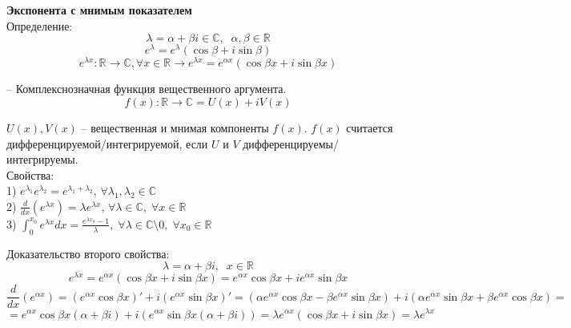 \documentclass{article}
\begin{document}
	
	\textbf{Экспонента с мнимым показателем}\\

	Определение:
	\begin{equation}
		\lambda = \alpha + \beta i \in \mathbb{C},\;\;\alpha,\beta\in\mathbb{R}
	\end{equation}
	\begin{equation}
		e^\lambda = e^\lambda(\cos\beta + i\sin\beta)
	\end{equation}
	\begin{equation}
		e^{\lambda x}: \mathbb{R}\rightarrow\mathbb{C},\forall x\in\mathbb{R}\rightarrow e^{\lambda x} = e^{\alpha x}(\cos\beta x + i\sin\beta x)
	\end{equation}

	-- Комплекснозначная функция вещественного аргумента.
	\begin{equation}
		f(x): \mathbb{R}\rightarrow\mathbb{C} = U(x)+iV(x)
	\end{equation}

	$U(x), V(x)$ -- вещественная и мнимая компоненты $f(x)$. $f(x)$ считается дифференцируемой/интегрируемой, если $U$ и $V$ дифференцируемы/интегрируемы.\\

	Свойства:\\

	1) $e^{\lambda_1}e^{\lambda_2}=e^{\lambda_1+\lambda_2}$, $\forall\lambda_1,\lambda_2\in\mathbb{C}$\\

	2) $\frac{d}{dx}(e^{\lambda x}) = \lambda e^{\lambda x}$, $\forall \lambda\in\mathbb{C},\;\forall x\in\mathbb{R}$\\

	3) $\int_0^{x_0}e^{\lambda x}dx = \frac{e^{\lambda x_0}-1}{\lambda},\;\forall\lambda\in\mathbb{C}\setminus 0,\;\forall x_0\in\mathbb{R}$

	Доказательство второго свойства:
	\begin{equation}
		\lambda = \alpha + \beta i,\;\;x\in\mathbb{R}
	\end{equation}
	\begin{equation}
		e^{\lambda x} = e^{\alpha x}(\cos\beta x + i\sin\beta x) = e^{\alpha x}\cos\beta x + ie^{\alpha x}\sin\beta x
	\end{equation}
	\begin{equation}
		\frac{d}{dx}(e^{\alpha x}) = (e^{\alpha x}\cos\beta x)' + i(e^{\alpha x}\sin\beta x)' = (\alpha e^{\alpha x}\cos\beta x - \beta e^{\alpha x}\sin\beta x) + i(\alpha e^{\alpha x}\sin\beta x + \beta e^{\alpha x}\cos\beta x) = 
	\end{equation}
	\begin{equation}
		=e^{\alpha x}\cos\beta x(\alpha + \beta i) + i(e^{\alpha x}\sin\beta x(\alpha + \beta i)) = \lambda e^{\alpha x}(\cos\beta x + i\sin\beta x) = \lambda e^{\lambda x}
	\end{equation}
\end{document}
